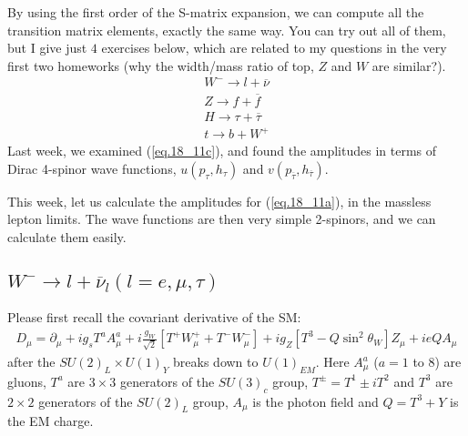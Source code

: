 \documentclass[12pt]{article}
\def\del{{\partial}}
\begin{document}
By using the first order of the S-matrix expansion, we can compute all
the transition matrix elements, exactly the same way.  You can try out all of them, but I give just $4$ exercises
below, which are related to my questions in the very first two homeworks
(why the width/mass ratio of top, $Z$ and $W$ are similar?).
\begin{eqnarray}
    W^- \to l + {\overline \nu} \label{eq.18_11a}\\
    Z   \to  f + {\overline f} \label{eq.18_11b} \\
    H   \to  \tau + {\overline \tau} \label{eq.18_11c}\\
    t   \to  b + W^+ \label{eq.18_11d}
\end{eqnarray}
Last week, we examined (\ref{eq.18_11c}), and found the amplitudes in terms of
Dirac 4-spinor wave functions, $u(p_\tau,h_\tau)$ and $v(p_{\overline \tau},h_{\overline \tau})$.

This week, let us calculate the amplitudes for (\ref{eq.18_11a}), in the massless lepton limits. The wave functions are then very simple 2-spinors,
and we can calculate them easily.

\subsection{$W^- \to l + {\overline \nu}_l (l=e,\mu,\tau)$}
Please first recall the covariant derivative of the SM:
\begin{eqnarray}
    D_\mu = \del_\mu
    + i g_s           T^a A^a_\mu
    + i \frac{g_W}{\sqrt 2} [T^+ W^+_\mu  + T^- W^-_\mu]
    + i g_Z [ T^3 - Q \sin^2\theta_W ] Z_\mu
    + i e Q A_\mu \label{eq.18_12}
\end{eqnarray}
after the $SU(2)_L \times U(1)_Y$ breaks down to $U(1)_{EM}$.  Here $A^a_\mu$
($a=1$ to $8$) are gluons, $T^a$ are $3\times3$ generators of the $SU(3)_c$ group, $T^\pm = T^1 \pm iT^2$ and $T^3$ are $2\times 2$ generators of the $SU(2)_L$ group, $A_\mu$ is the photon field and $Q=T^3+Y$ is the EM charge.
\end{document}
